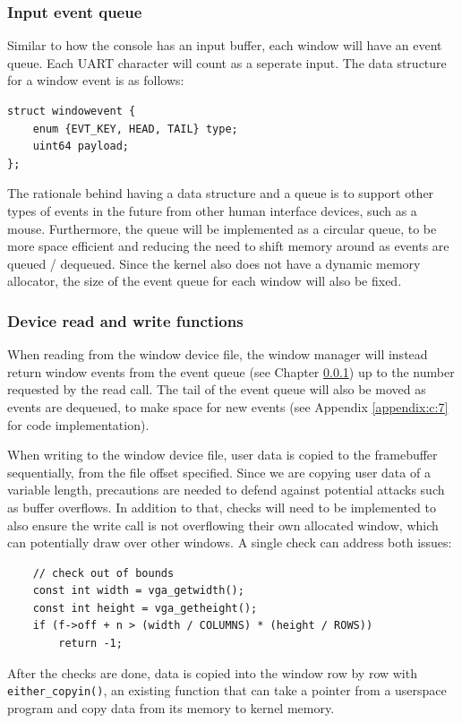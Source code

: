 \subsubsection{Input event queue}
\label{chapter2:impl:winman:evtq}
Similar to how the console has an input buffer, each window will have an event
queue. Each UART character will count as a seperate input. The data structure
for a window event is as follows:
\begin{verbatim}
struct windowevent {
    enum {EVT_KEY, HEAD, TAIL} type;
    uint64 payload;
};
\end{verbatim}
The rationale behind having a data structure and a queue is to support other
types of events in the future from other human interface devices, such as a mouse.
Furthermore, the queue will be implemented as a circular queue, to be more space
efficient and reducing the need to shift memory around as events are queued / dequeued.
Since the kernel also does not have a dynamic memory allocator, the size of the event
queue for each window will also be fixed.

\subsubsection{Device read and write functions}
When reading from the window device file, the window manager will instead return
window events from the event queue (see Chapter \ref{chapter2:impl:winman:evtq}) up
to the number requested by the read call. The tail of the event queue will also
be moved as events are dequeued, to make space for new events (see Appendix \ref{appendix:c:7} for code implementation).

When writing to the window device file, user data is copied to the framebuffer sequentially,
from the file offset specified. Since we are copying user data of a variable length,
precautions are needed to defend against potential attacks such as buffer overflows.
In addition to that, checks will need to be implemented to also ensure the write call
is not overflowing their own allocated window, which can potentially draw over
other windows. A single check can address both issues:

\begin{verbatim}
    // check out of bounds
    const int width = vga_getwidth();
    const int height = vga_getheight();
    if (f->off + n > (width / COLUMNS) * (height / ROWS))
        return -1;
\end{verbatim}

After the checks are done, data is copied into the window row by row with
\texttt{either_copyin()}, an existing function that can take a pointer
from a userspace program and copy data from its memory to kernel memory.

